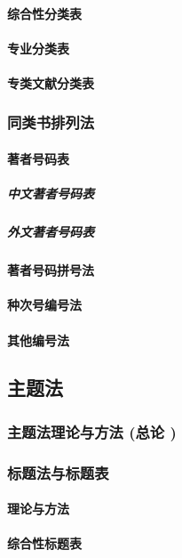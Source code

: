 \documentclass[UTF8]{../../ApplicationUniverse}
\begin{document}
            \paragraph{综合性分类表}
            \paragraph{专业分类表}
            \paragraph{专类文献分类表}
        \subsubsection{同类书排列法}
            \paragraph{著者号码表}
                \subparagraph{中文著者号码表}
                \subparagraph{外文著者号码表}
            \paragraph{著者号码拼号法}
            \paragraph{种次号编号法}
            \paragraph{其他编号法}
    \subsection{主题法}
        \subsubsection{主题法理论与方法 (总论 )}
        \subsubsection{标题法与标题表}
            \paragraph{理论与方法}
            \paragraph{综合性标题表}
\end{document}

